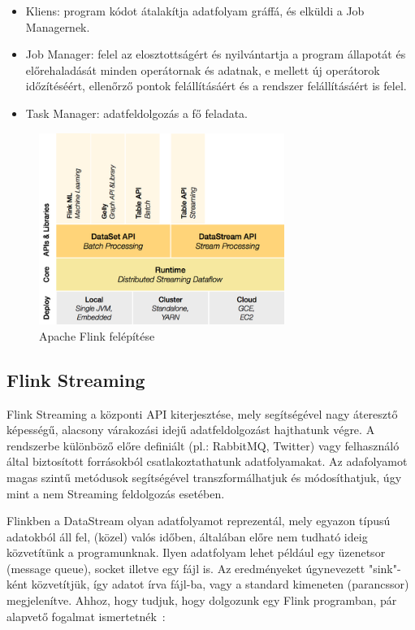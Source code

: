 \documentclass[a4paper,12pt]{article}
\begin{document}
\begin{itemize}
\item Kliens: program kódot átalakítja adatfolyam gráffá, és elküldi a Job Managernek.
\item Job Manager: felel az elosztottságért és nyilvántartja a program állapotát és előrehaladását minden operátornak és adatnak, e mellett új operátorok időzítéséért, ellenőrző pontok felállításáért és a rendszer felállításáért is felel.
\item Task Manager: adatfeldolgozás a fő feladata.
\end{itemize}

\begin{figure}[H]
\centering
\includegraphics[width=80mm]{img/flink.png}
\caption{Apache Flink felépítése~\cite{flink} \label{apache_flink}}
\end{figure}

\subsection{Flink Streaming~\cite{streamprocessing}}

Flink Streaming a központi API kiterjesztése, mely segítségével nagy áteresztő képességű, alacsony várakozási idejű adatfeldolgozást hajthatunk végre. A rendszerbe különböző előre definiált (pl.: RabbitMQ, Twitter) vagy felhasználó által biztosított forrásokból csatlakoztathatunk adatfolyamakat. Az adafolyamot magas szintű metódusok segítségével transzformálhatjuk és módosíthatjuk, úgy mint a nem Streaming feldolgozás esetében.  

Flinkben a DataStream olyan adatfolyamot reprezentál, mely egyazon típusú adatokból áll fel, (közel) valós időben, általában előre nem tudható ideig közvetítünk a programunknak. Ilyen adatfolyam lehet például egy üzenetsor (message queue), socket illetve egy fájl is. Az eredményeket úgynevezett "sink"-ként közvetítjük, így adatot írva fájl-ba, vagy a standard kimeneten (parancssor) megjelenítve. Ahhoz, hogy tudjuk, hogy dolgozunk egy Flink programban, pár alapvető fogalmat ismertetnék~\cite{datastreamapi}:
\end{document}

